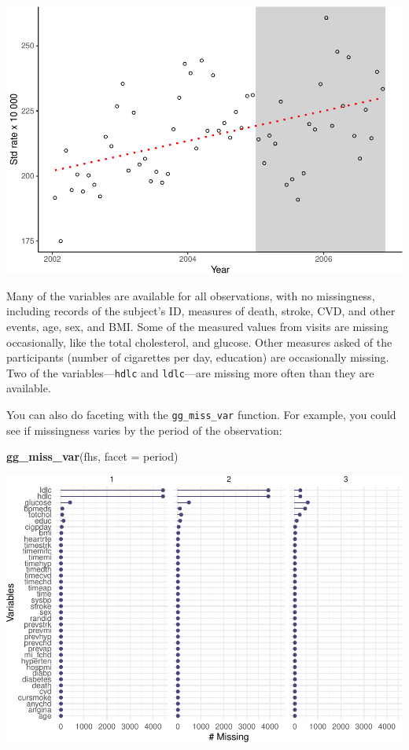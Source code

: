 \documentclass[
]{book}
\newenvironment{Shaded}{\begin{snugshade}}{\end{snugshade}}
\newcommand{\DataTypeTok}[1]{\textcolor[rgb]{0.13,0.29,0.53}{#1}}
\newcommand{\KeywordTok}[1]{\textcolor[rgb]{0.13,0.29,0.53}{\textbf{#1}}}
\newcommand{\NormalTok}[1]{#1}
\begin{document}
\includegraphics{adv_epi_analysis_files/figure-latex/unnamed-chunk-66-1.pdf}

Many of the variables are available for all observations, with no missingness,
including records of the subject's ID, measures of death, stroke, CVD, and other
events, age, sex, and BMI. Some of the measured values from visits are missing
occasionally, like the total cholesterol, and glucose. Other measures asked of
the participants (number of cigarettes per day, education) are occasionally
missing. Two of the variables---\texttt{hdlc} and \texttt{ldlc}---are missing more often than
they are available.

You can also do faceting with the \texttt{gg\_miss\_var} function. For
example, you could see if missingness varies by the period of the observation:

\begin{Shaded}
\begin{Highlighting}[]
\KeywordTok{gg_miss_var}\NormalTok{(fhs, }\DataTypeTok{facet =}\NormalTok{ period)}
\end{Highlighting}
\end{Shaded}

\includegraphics{adv_epi_analysis_files/figure-latex/unnamed-chunk-67-1.pdf}
\end{document}
